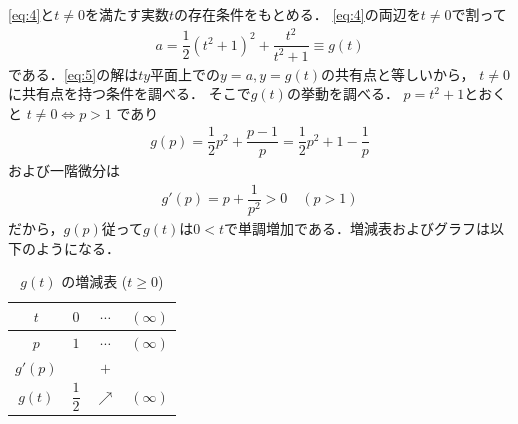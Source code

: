 \documentclass[../../main.tex]{subfiles}
\begin{document}
\cref{eq:4}と$t\ne0$を満たす実数$t$の存在条件をもとめる．
\cref{eq:4}の両辺を$t\ne 0$で割って
\begin{align}
  a=\dfrac{1}{2}(t^2+1)^2+\dfrac{t^2}{t^2+1} \equiv g(t) \label{eq:5}
\end{align}
である．\cref{eq:5}の解は$ty$平面上での$y=a,y=g(t)$の共有点と等しいから，
$t\ne 0$に共有点を持つ条件を調べる．
そこで$g(t)$の挙動を調べる．
$p=t^2+1$とおくと $t\ne0\iff p>1$ であり
\begin{align}
  g(p)=\dfrac{1}{2}p^2+\dfrac{p-1}{p}=\dfrac{1}{2}p^2+1-\dfrac{1}{p}
\end{align}
および一階微分は
\begin{align}
  g'(p)=p+\dfrac{1}{p^2} > 0 \quad (p>1)
\end{align}
だから，$g(p)$従って$g(t)$は$0<t$で単調増加である．増減表およびグラフは以下のようになる．

\begin{table}[htb]
  \centering
  \caption{$g(t)$ の増減表 ($t \ge 0$)}
  \label{tab:gt_monotonicity}
  \renewcommand{\arraystretch}{1.5}
  \begin{tabular}{|c|c|c|c|}
    \hline
    $t$      & $0$         & $\cdots$   & $(\infty)$ \\ \hline
    $p$      & $1$         & $\cdots$   & $(\infty)$ \\ \hline
    $g'(p)$  &             & $+$        &            \\ \hline
    $g(t)$   & $\dfrac{1}{2}$ & $\nearrow$ & $(\infty)$ \\ \hline
  \end{tabular}
\end{table}
\end{document}
